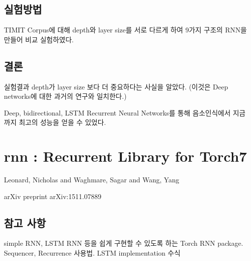 \documentclass[ %
    a4paper,    %
    amsmath,    %
    itemph,     %
11pt]{oblivoir}     %
\begin{document}
\subsection{실험방법}
TIMIT Corpus에 대해 depth와 layer size를 서로 다르게 하여 9가지 구조의 RNN을 만들어 비교 실험하였다.

\subsection{결론}
실험결과 depth가 layer size 보다 더 중요하다는 사실을 알았다. (이것은 Deep networks에 대한 과거의 연구와 일치한다.)

Deep, bidirectional, LSTM Recurrent Neural Networks를 통해 음소인식에서 지금까지 최고의 성능을 얻을 수 있었다.


\section{rnn : Recurrent Library for Torch7\cite{leonard2015}}

\begin{description}\tightlist
\item[저자] Leonard, Nicholas and Waghmare, Sagar and Wang, Yang
\item[학술지] arXiv preprint arXiv:1511.07889
\end{description}

\subsection{참고 사항}
simple RNN, LSTM RNN 등을 쉽게 구현할 수 있도록 하는 Torch RNN package.
Sequencer, Recurrence 사용법.
LSTM implementation 수식




\end{document}
